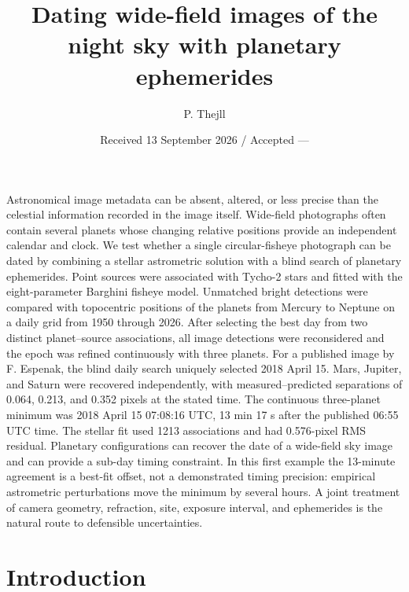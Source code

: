 \documentclass{aa}
\begin{document}
\title{Dating wide-field images of the night sky with planetary ephemerides}
\author{P. Thejll}
\date{Received 13 September 2026 / Accepted ---}

\abstract
{Astronomical image metadata can be absent, altered, or less precise than the
celestial information recorded in the image itself. Wide-field photographs
often contain several planets whose changing relative positions provide an
independent calendar and clock.}
{We test whether a single circular-fisheye photograph can be dated by combining
a stellar astrometric solution with a blind search of planetary ephemerides.}
{Point sources were associated with Tycho-2 stars and fitted with the
eight-parameter Barghini fisheye model. Unmatched bright detections were
compared with topocentric positions of the planets from Mercury to Neptune on
a daily grid from 1950 through 2026. After selecting the best day from two
distinct planet--source associations, all image detections were reconsidered
and the epoch was refined continuously with three planets.}
{For a published image by F. Espenak, the blind daily search uniquely selected
2018 April 15. Mars, Jupiter, and Saturn were recovered independently, with
measured--predicted separations of 0.064, 0.213, and 0.352 pixels at the stated
time. The continuous three-planet minimum was 2018 April 15 07:08:16 UTC,
13 min 17 s after the published 06:55 UTC time. The stellar fit used 1213
associations and had 0.576-pixel RMS residual.}
{Planetary configurations can recover the date of a wide-field sky image and
can provide a sub-day timing constraint. In this first example the 13-minute
agreement is a best-fit offset, not a demonstrated timing precision: empirical
astrometric perturbations move the minimum by several hours. A joint treatment
of camera geometry, refraction, site, exposure interval, and ephemerides is the
natural route to defensible uncertainties.}
\maketitle

\section{Introduction}
\label{sec:introduction}
\end{document}
